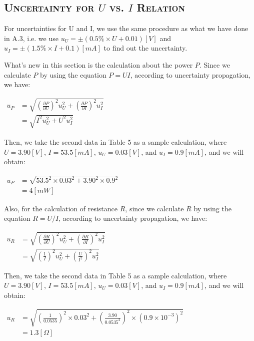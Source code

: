 \documentclass[a4paper,12pt]{article}
\begin{document}
\begin{appendices}
\subsection{\textsc{Uncertainty for $U$ vs. $I$ Relation}}
For uncertainties for U and I, we use the same procedure as what we have done in A.3, i.e. we use $ u_{U} =\pm(0.5 \% \times U+0.01)[V] $ and $u_{I} =\pm(1.5 \% \times I+0.1)[mA]$ to find out the uncertainty. 
\par What's new in this section is the calculation about the power $P$. Since we calculate $P$ by using the equation $P = UI$, according to uncertainty propagation, we have:
\begin{center}
$\begin{aligned} u_{P} &=\sqrt{\left(\frac{\partial P}{\partial U}\right)^{2} u_{U}^{2}+\left(\frac{\partial P}{\partial I}\right)^{2} u_{I}^{2}} \\ &=\sqrt{I^{2} u_{U}^{2}+U^{2} u_{I}^{2}} \end{aligned}$
\end{center}
Then, we take the second data in Table 5 as a sample calculation, where $U = 3.90 [V]$, $I = 53.5 [mA]$, $u_U = 0.03 [V]$, and $u_I = 0.9 [mA]$, and we will obtain:
\begin{center}
$\begin{aligned} u_{P} &=\sqrt{53.5^2 \times 0.03^2 + 3.90^2 \times 0.9^2} \\ &= 4 [mW] \end{aligned}$
\end{center}
\par Also, for the calculation of resistance $R$, since we calculate $R$ by using the equation $R = U/I$, according to uncertainty propagation, we have:
\begin{center}
$\begin{aligned} u_{R} &=\sqrt{\left(\frac{\partial R}{\partial U}\right)^{2} u_{U}^{2}+\left(\frac{\partial R}{\partial I}\right)^{2} u_{I}^{2}} \\ &=\sqrt{\left(\frac{1}{I}\right)^{2} u_{U}^{2}+\left(\frac{U}{I^{2}}\right)^{2} u_{I}^{2}} \end{aligned}$
\end{center}
Then, we take the second data in Table 5 as a sample calculation, where $U = 3.90 [V]$, $I = 53.5 [mA]$, $u_U = 0.03 [V]$, and $u_I = 0.9 [mA]$, and we will obtain:
\begin{center}
$\begin{aligned} u_{R} &=\sqrt{(\frac{1}{0.0535})^2 \times 0.03^2 + (\frac{3.90}{0.0535^2})^2 \times (0.9\times 10^{-3})^2} \\ &= 1.3 [\Omega] \end{aligned}$
\end{center}


\end{appendices}
\end{document}
